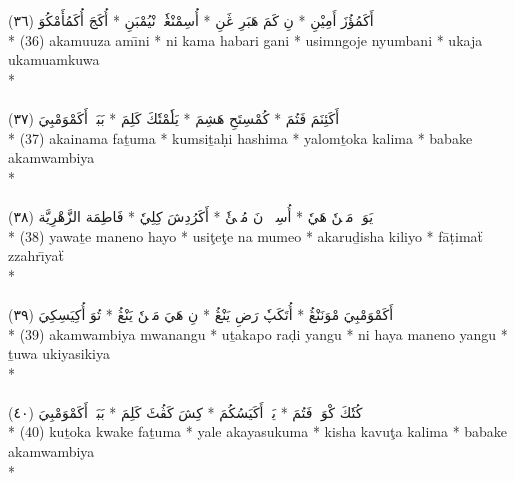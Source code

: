 \documentclass[a4paper, 12pt]{report}
\begin{document}
\begin{center}
\textarabic{(٣٦) \textcolor{mygreen}{أَكَمُؤُزَ أَمِيْنِ  * نِ كَمَ هَبَرِ ڠَنِ  * أُسِمْنْڠٗجٖ نْيُمْبَنِ  * أُكَجَ أُكَمُأَمْكُوَ }} \\* 
(36) akamuuza amı̄ni  * ni kama habari gani  * usimngoje nyumbani  * ukaja ukamuamkuwa  \\* 
 \\ 
\\[8mm] 

\textarabic{(٣٧) \textcolor{mygreen}{أَكَئِنَمَ فَتُمَ  * كُمْسِتَحِ هَشِمَ  * يَلٗمْتٗكَ كَلِمَ  * بَبَكٖ أَكَمْوَمْبِيَ }} \\* 
(37) akainama faṯuma  * kumsiṯaḥi hashima  * yalomṯoka kalima  * babake akamwambiya  \\* 
 \\ 
\\[8mm] 

\textarabic{(٣٨) \textcolor{mygreen}{يَوَتٖ مَنٖنٗ هَيٗ  * أُسِٹٖٹٖ نَ مُمٖئٗ  * أَكَرُدِشَ كِلِيٗ  * فَاطِمَة الزَّهْرِيَّة }} \\* 
(38) yawaṯe maneno hayo  * usiţeţe na mumeo  * akaruḏisha kiliyo  * fāṭimaẗ zzahrı̄yaẗ  \\* 
 \\ 
\\[8mm] 

\textarabic{(٣٩) \textcolor{mygreen}{أَكَمْوَمْبِيَ مْوَنَنْڠُ  * أُتَكَپٗ رَضِ يَنْڠُ  * نِ هَيَ مَنٖنٗ يَنْڠُ  * تُوَ أُكِيَسِكِيَ }} \\* 
(39) akamwambiya mwanangu  * uṯakapo raḍi yangu  * ni haya maneno yangu  * ṯuwa ukiyasikiya  \\* 
 \\ 
\\[8mm] 

\textarabic{(٤٠) \textcolor{mygreen}{كُتٗكَ كْوَكٖ فَتُمَ  * يَلٖ أَكَيَسُكُمَ  * كِشَ كَڤُٹَ كَلِمَ  * بَبَكٖ أَكَمْوَمْبِيَ }} \\* 
(40) kuṯoka kwake faṯuma  * yale akayasukuma  * kisha kavuţa kalima  * babake akamwambiya  \\* 
 \\ 
\\[8mm] 


\end{center}
\end{document}
